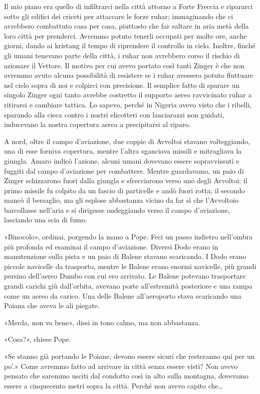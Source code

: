 Il mio piano era quello di infiltrarci nella città attorno a Forte
Freccia e ripararci sotto gli edifici dei criceti per attaccare le forze
ruhar; immaginando che ci avrebbero combattuto casa per casa, piuttosto
che far saltare in aria metà della loro città per prenderci. Avremmo
potuto tenerli occupati per molte ore, anche giorni, dando ai kristang
il tempo di riprendere il controllo in cielo. Inoltre, finché gli umani
tenevano parte della città, i ruhar non avrebbero corso il rischio di
azionare il Vettore. Il motivo per cui avevo portato così tanti Zinger è
che non avremmo avuto alcuna possibilità di resistere se i ruhar
avessero potuto fluttuare nel cielo sopra di noi e colpirci con
precisione. Il semplice fatto di sparare un singolo Zinger ogni tanto
avrebbe costretto il supporto aereo ravvicinato ruhar a ritirarsi e
cambiare tattica. Lo sapevo, perché in Nigeria avevo visto che i
ribelli, sparando alla cieca contro i nostri elicotteri con lanciarazzi
non guidati, inducevano la nostra copertura aerea a precipitarsi al
riparo.

A nord, oltre il campo d'aviazione, due coppie di Avvoltoi stavano
volteggiando, una di esse forniva copertura, mentre l'altra sganciava
missili e mitragliava la giungla. Amaro indicò l'azione, alcuni umani
dovevano essere sopravvissuti e fuggiti dal campo d'aviazione per
combattere. Mentre guardavamo, un paio di Zinger schizzarono fuori dalla
giungla e sfrecciarono verso uno degli Avvoltoi; il primo missile fu
colpito da un fascio di particelle e andò fuori rotta; il secondo mancò
il bersaglio, ma gli esplose abbastanza vicino da far sì che l'Avvoltoio
barcollasse nell'aria e si dirigesse ondeggiando verso il campo
d'aviazione, lasciando una scia di fumo.

«Binocolo», ordinai, porgendo la mano a Pope. Feci un passo indietro
nell'ombra più profonda ed esaminai il campo d'aviazione. Diversi Dodo
erano in manutenzione sulla pista e un paio di Balene stavano
scaricando. I Dodo erano piccole navicelle da trasporto, mentre le
Balene erano enormi navicelle, più grandi persino dell'aereo Dumbo con
cui ero arrivato. Le Balene potevano trasportare grandi carichi giù
dall'orbita, avevano porte all'estremità posteriore e una rampa come un
aereo da carico. Una delle Balene all'aeroporto stava scaricando una
Poiana che aveva le ali piegate.

«Merda, non va bene», dissi in tono calmo, ma non abbastanza.

«Cosa?», chiese Pope.

«Se stanno già portando le Poiane, devono essere sicuri che resteranno
qui per un po'.» Come avremmo fatto ad arrivare in città senza essere
visti? Non avevo pensato che saremmo usciti dal condotto così in alto
sulla montagna, dovevamo essere a cinquecento metri sopra la città.
Perché non avevo capito che\ldots{}

